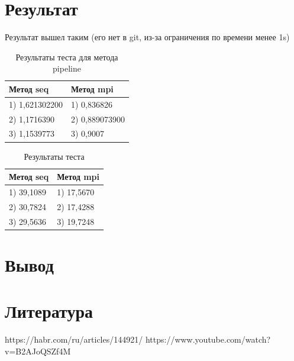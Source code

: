 \documentclass[a4paper]{article}
\begin{document}
\section{Результат}
\hspace{1cm} Результат вышел таким (его нет в git, из-за ограничения по времени менее 1s)\\
\begin{table}[h]
    \centering
    \caption{Результаты теста для метода pipeline}
    \begin{tabular}{@{}ll@{}}
        \toprule
        \textbf{Метод seq} & \textbf{Метод mpi} \\
        \midrule
        1) 1,621302200 & 1) 0,836826 \\
        2) 1,1716390   & 2) 0,889073900 \\
        3) 1,1539773   & 3) 0,9007 \\
        \bottomrule
    \end{tabular}
\end{table}
\begin{table}[h]
    \centering
    \caption{Результаты теста}
    \begin{tabular}{@{}ll@{}} 
        \toprule
        \textbf{Метод seq} & \textbf{Метод mpi} \\
        \midrule
        1) 39,1089 & 1) 17,5670 \\
        2) 30,7824 & 2) 17,4288 \\
        3) 29,5636 & 3) 19,7248 \\
        \bottomrule
    \end{tabular}
\end{table}

\section{Вывод}
\hspace{1cm}{Существенное увеличение эффективности mpi версии видно с увеличением кол-ва данных. Я считаю, что я молодец и поставленная цель выполнена.}
\section{Литература}
\hspace{1cm} https://habr.com/ru/articles/144921/
https://www.youtube.com/watch?v=B2AJoQSZf4M
\end{document}
